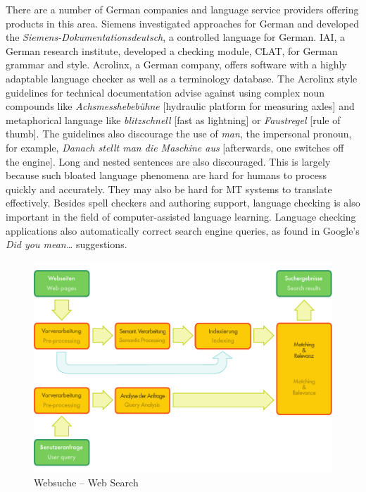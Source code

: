 \documentclass[]{../../metanetpaper}
\begin{document}
\begin{Parallel}[c]{79mm}{78mm}
{    There are a number of German companies and language service providers offering products in this area. Siemens investigated approaches for German and developed the \textit{Siemens-Dokumentationsdeutsch}, a controlled language for German. IAI, a German research institute, developed a checking module, CLAT, for German grammar and style. Acrolinx, a German company, offers software with a highly adaptable language checker as well as a terminology database. The Acrolinx style guidelines for technical documentation advise against using complex noun compounds like \textit{Achsmesshebebühne} {[}hydraulic platform for measuring axles{]} and metaphorical language like \textit{blitzschnell} {[}fast as lightning{]} or \textit{Faustregel} {[}rule of thumb{]}. The guidelines also discourage the use of \textit{man}, the impersonal pronoun, for example, \textit{Danach stellt man die Maschine aus} {[}afterwards, one switches off the engine{]}. Long and nested sentences are also discouraged. This is largely because such bloated language phenomena are hard for humans to process quickly and accurately. They may also be hard for MT systems to translate effectively.
Besides spell checkers and authoring support, language checking is also important in the field of computer-assisted language learning. Language checking applications also automatically correct search engine queries, as found in Google's \textit{Did you mean…} suggestions.
  }
  \ParallelPar

\clearpage


\begin{figure}[h!]
  \center
  \includegraphics[width=\textwidth]{../_media/web_search_architecture}
  \caption{Websuche -- Web Search}
  \label{fig:websearcharch}
 \end{figure}


\end{Parallel}
\end{document}
